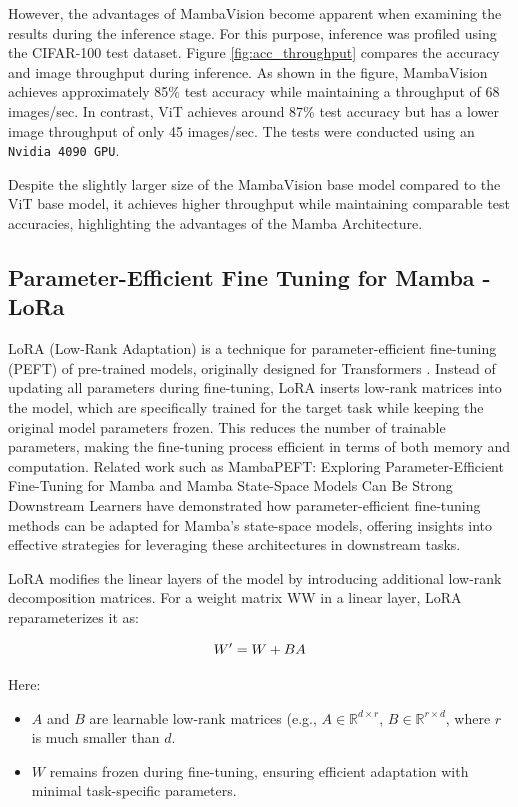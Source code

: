 \documentclass[12pt, conference, compsoc, onecolumn]{IEEEtran}
\begin{document}
	However, the advantages of MambaVision become apparent when examining the results during the inference stage. For this purpose, inference was profiled using the CIFAR-100 test dataset. Figure \ref{fig:acc_throughput} compares the accuracy and image throughput during inference. As shown in the figure, MambaVision achieves approximately 85\% test accuracy while maintaining a throughput of 68 images/sec. In contrast, ViT achieves around 87\% test accuracy but has a lower image throughput of only 45 images/sec. The tests were conducted using an \texttt{Nvidia 4090 GPU}.
	
	Despite the slightly larger size of the MambaVision base model compared to the ViT base model, it achieves higher throughput while maintaining comparable test accuracies, highlighting the advantages of the Mamba Architecture.
	
	\newpage
	
	\subsection{Parameter-Efficient Fine Tuning for Mamba - LoRa}
	LoRA (Low-Rank Adaptation) is a technique for parameter-efficient fine-tuning (PEFT) of pre-trained models, originally designed for Transformers \cite{hu2021llora}. Instead of updating all parameters during fine-tuning, LoRA inserts low-rank matrices into the model, which are specifically trained for the target task while keeping the original model parameters frozen. This reduces the number of trainable parameters, making the fine-tuning process efficient in terms of both memory and computation. Related work such as MambaPEFT: Exploring Parameter-Efficient Fine-Tuning for Mamba \cite{yoshimura2024mambapeft} and Mamba State-Space Models Can Be Strong Downstream Learners \cite{halloran2024mamba} have demonstrated how parameter-efficient fine-tuning methods can be adapted for Mamba’s state-space models, offering insights into effective strategies for leveraging these architectures in downstream tasks.
	
	LoRA modifies the linear layers of the model by introducing additional low-rank decomposition matrices. For a weight matrix WW in a linear layer, LoRA reparameterizes it as:
	
	\begin{equation}
		\centering
		W' = W + BA
		\label{eq:lora}
	\end{equation}
	
	Here:
	\begin{itemize}
		\item $A$ and $B$ are learnable low-rank matrices (e.g., $A \in \mathbb{R}^{d \times r}$, $B \in \mathbb{R}^{r \times d}$, where $r$ is much smaller than $d$.
		\item \( W \) remains frozen during fine-tuning, ensuring efficient adaptation with minimal task-specific parameters.
	\end{itemize}
	
\end{document}
